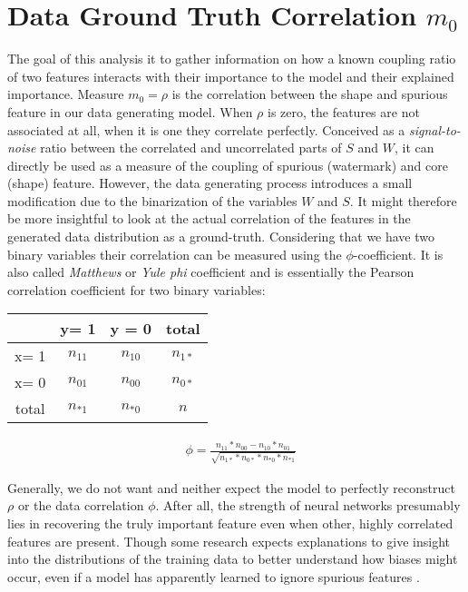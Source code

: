 
\section{Data Ground Truth Correlation $m_0$}
The goal of this analysis it to gather information on how a known coupling ratio of two features interacts with their importance to the model and their explained importance. 
Measure $m_0 = \rho$ is the correlation between the shape and spurious feature in our data generating model. When $\rho$ is zero, the features are not associated at all, when it is one they correlate perfectly. Conceived as a \textit{signal-to-noise} ratio between the correlated and uncorrelated parts of $S$ and $W$, it can directly be used as a measure of the coupling of spurious (watermark) and core (shape) feature. However, the data generating process introduces a small modification due to the binarization of the variables $W$ and $S$. It might therefore be more insightful to look at the actual correlation of the features in the generated data distribution as a ground-truth. Considering that we have two binary variables their correlation can be measured using the $\phi$-coefficient. It is also called \textit{Matthews} or \textit{Yule phi} coefficient and is essentially the Pearson correlation coefficient for two binary variables:

\vspace{1em}
\begin{minipage}[t]{0.45\textwidth}
\begin{tabular}{|c|c|c|c|}
    \hline
     & y= 1 & y = 0 & total  \\  \hline
    x= 1 & $n_{11}$ & $n_{10}$ & $n_{1*}$ \\ \hline
    x= 0 & $n_{01}$ & $n_{00}$ & $n_{0*}$ \\ \hline
    total& $n_{*1}$ & $n_{*0}$ & $n$ \\ \hline
\end{tabular}
\end{minipage}%
\begin{minipage}[c]{0.45\textwidth}
\begin{align}
& \phi = \frac{n_{11} * n_{00} - n_{10}*n_{01}}{\sqrt{n_{1*}*n_{0*}*n_{*0}*n_{*1}}}
\end{align}
\end{minipage}
\vspace{1em}

Generally, we do not want and neither expect the model to perfectly reconstruct $\rho$ or the data correlation $\phi$. After all, the strength of neural networks presumably lies in recovering the truly important feature even when other, highly correlated features are present. Though some research expects explanations to give insight into the distributions of the training data to better understand how biases might occur, even if a model has apparently learned to ignore spurious features \cite{Kindermans2017}. 

